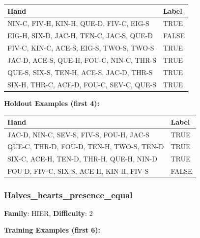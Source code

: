 \documentclass[10pt,a4paper]{article}
\begin{document}
\begin{small}
\begin{tabular}{p{8cm}l}
\toprule
Hand & Label \\
\midrule
NIN-C, FIV-H, KIN-H, QUE-D, FIV-C, EIG-S & \textcolor{positive}{TRUE} \\
EIG-H, SIX-D, JAC-H, TEN-C, JAC-S, QUE-D & \textcolor{negative}{FALSE} \\
FIV-C, KIN-C, ACE-S, EIG-S, TWO-S, TWO-S & \textcolor{positive}{TRUE} \\
JAC-D, ACE-S, QUE-H, FOU-C, NIN-C, THR-S & \textcolor{positive}{TRUE} \\
QUE-S, SIX-S, TEN-H, ACE-S, JAC-D, THR-S & \textcolor{positive}{TRUE} \\
SIX-H, THR-C, ACE-D, FOU-C, SEV-C, QUE-S & \textcolor{positive}{TRUE} \\
\bottomrule
\end{tabular}
\end{small}

\textbf{Holdout Examples (first 4):}

\begin{small}
\begin{tabular}{p{8cm}l}
\toprule
Hand & Label \\
\midrule
JAC-D, NIN-C, SEV-S, FIV-S, FOU-H, JAC-S & \textcolor{positive}{TRUE} \\
QUE-C, THR-D, FOU-D, TEN-H, TWO-S, TEN-D & \textcolor{positive}{TRUE} \\
SIX-C, ACE-H, TEN-D, THR-H, QUE-H, NIN-D & \textcolor{positive}{TRUE} \\
FOU-D, FIV-C, SIX-S, ACE-H, KIN-H, FIV-S & \textcolor{negative}{FALSE} \\
\bottomrule
\end{tabular}
\end{small}

\vspace{0.5cm}

\subsubsection{Halves\_hearts\_presence\_equal}

\textbf{Family}: HIER, \textbf{Difficulty}: 2

\textbf{Training Examples (first 6):}
\end{document}
